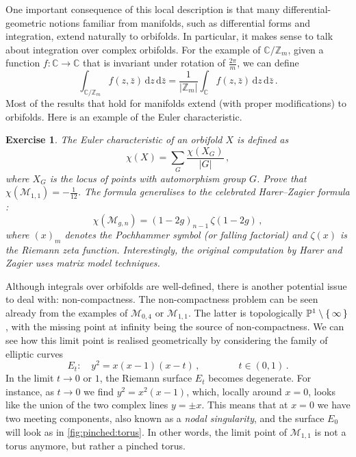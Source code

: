 \documentclass[11pt,reqno]{amsart}
\numberwithin{equation}{section}
\newcommand{\dd}{\mathrm{d}}
\newcommand{\mb}[1]{\mathbb{#1}}
\newcommand{\mc}[1]{\mathcal{#1}}
\newcommand{\Z}{\mb{Z}}
\newcommand{\C}{\mb{C}}
\renewcommand{\P}{\mb{P}}
\newcommand{\M}{\mc{M}}
\theoremstyle{plain}
\newtheorem{exercise}{Exercise}[section]
\theoremstyle{definition}
\begin{document}
One important consequence of this local description is that many differential-geometric notions familiar from manifolds, such as differential forms and integration, extend naturally to orbifolds. In particular, it makes sense to talk about integration over complex orbifolds. For the example of $\C/\Z_{m}$, given a function $f \colon \C \to \C$ that is invariant under rotation of $\frac{2\pi}{m}$, we can define
\begin{equation}
  \int_{\C/\Z_{m}} f(z,\bar{z}) \, \dd z \, \dd\bar{z}
  =
  \frac{1}{|\Z_m|} \int_{\C} f(z,\bar{z}) \, \dd z \, \dd\bar{z} \,.
\end{equation}
Most of the results that hold for manifolds extend (with proper modifications) to orbifolds. Here is an example of the Euler characteristic.

\begin{exercise}
  The Euler characteristic of an orbifold $X$ is defined as
  \begin{equation}
    \chi(X) = \sum_{G} \frac{\chi(X_G)}{|G|} \,,
  \end{equation}
  where $X_G$ is the locus of points with automorphism group $G$. Prove that $\chi(\M_{1,1}) = - \frac{1}{12}$. The formula generalises to the celebrated Harer--Zagier formula \cite{HZ86}:
  \begin{equation}
    \chi(\M_{g,n}) = (1-2g)_{n-1} \, \zeta(1-2g) \,,
  \end{equation}
  where $(x)_m$ denotes the Pochhammer symbol (or falling factorial) and $\zeta(x)$ is the Riemann zeta function. %
  Interestingly, the original computation by Harer and Zagier uses matrix model techniques.
\end{exercise}

Although integrals over orbifolds are well-defined, there is another potential issue to deal with: non-compactness. %
The non-compactness problem can be seen already from the examples of $\M_{0,4}$ or $\M_{1,1}$. The latter is topologically $\P^1 \setminus \set{\infty}$, with the missing point at infinity being the source of non-compactness. We can see how this limit point is realised geometrically by considering the family of elliptic curves
\begin{equation}
  E_t \colon
  \quad
  y^2 = x(x-1)(x-t) \,,
  \qquad\qquad
  t \in (0,1) \,.
\end{equation}
In the limit $t \to 0$ or $1$, the Riemann surface $E_t$ becomes degenerate. For instance, as $t \to 0$ we find $y^2 = x^2(x-1)$, which, locally around $x = 0$, looks like the union of the two complex lines $y = \pm x$. This means that at $x = 0$ we have two meeting components, also known as a \emph{nodal singularity}, and the surface $E_0$ will look as in \cref{fig:pinched:torus}. In other words, the limit point of $\M_{1,1}$ is not a torus anymore, but rather a pinched torus.
\end{document}
